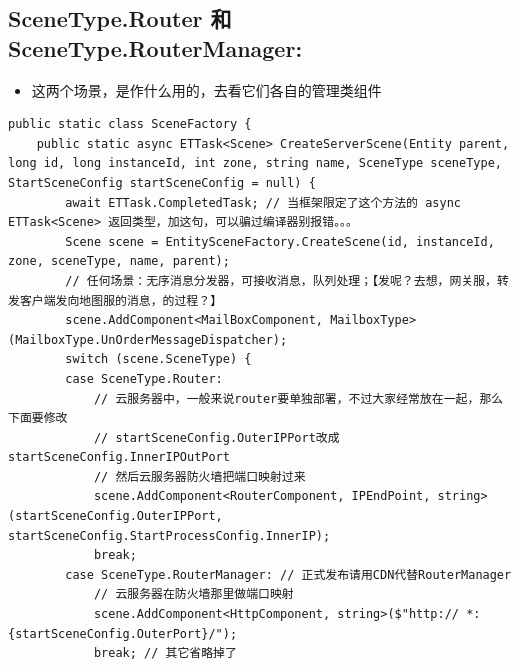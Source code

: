 \documentclass[9pt, b5paper]{article}
\begin{document}
\subsection{SceneType.Router 和 SceneType.RouterManager:}
\label{sec-7-1}
\begin{itemize}
\item 这两个场景，是作什么用的，去看它们各自的管理类组件
\end{itemize}
\begin{verbatim}
public static class SceneFactory {
    public static async ETTask<Scene> CreateServerScene(Entity parent, long id, long instanceId, int zone, string name, SceneType sceneType, StartSceneConfig startSceneConfig = null) {
        await ETTask.CompletedTask; // 当框架限定了这个方法的 async ETTask<Scene> 返回类型，加这句，可以骗过编译器别报错。。。
        Scene scene = EntitySceneFactory.CreateScene(id, instanceId, zone, sceneType, name, parent);
        // 任何场景：无序消息分发器，可接收消息，队列处理；【发呢？去想，网关服，转发客户端发向地图服的消息，的过程？】
        scene.AddComponent<MailBoxComponent, MailboxType>(MailboxType.UnOrderMessageDispatcher); 
        switch (scene.SceneType) {
        case SceneType.Router:
            // 云服务器中，一般来说router要单独部署，不过大家经常放在一起，那么下面要修改
            // startSceneConfig.OuterIPPort改成startSceneConfig.InnerIPOutPort
            // 然后云服务器防火墙把端口映射过来
            scene.AddComponent<RouterComponent, IPEndPoint, string>(startSceneConfig.OuterIPPort, startSceneConfig.StartProcessConfig.InnerIP);
            break;
        case SceneType.RouterManager: // 正式发布请用CDN代替RouterManager
            // 云服务器在防火墙那里做端口映射
            scene.AddComponent<HttpComponent, string>($"http:// *:{startSceneConfig.OuterPort}/");
            break; // 其它省略掉了
\end{verbatim}
\end{document}
